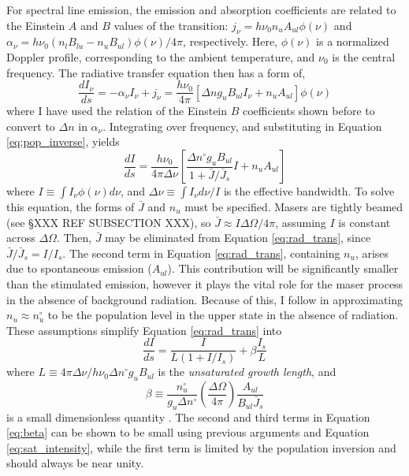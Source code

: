 For spectral line emission, the emission and absorption coefficients are related to the Einstein $A$ and $B$ values of the transition: $j_\nu = h \nu_0 n_u A_{ul}\phi(\nu)$ and $\alpha_\nu = h\nu_0 \left( n_l B_{lu} - n_u B_{ul} \right)\phi(\nu)/4\pi$, respectively. Here, $\phi(\nu)$ is a normalized Doppler profile, corresponding to the ambient temperature, and $\nu_0$ is the central frequency. The radiative transfer equation then has a form of,
\begin{equation}
\label{eq:rad_trans_specific}
\frac{dI_{\nu}}{ds} = -\alpha_{\nu}I_{\nu} + j_{\nu}
    = \frac{h \nu_0}{4\pi} \left[ \Delta n g_u B_{ul} I_{\nu} + n_u A_{ul} \right] \phi(\nu)
\end{equation}
where I have used the relation of the Einstein $B$ coefficients shown before to convert to $\Delta n$ in $\alpha_{\nu}$. Integrating over frequency, and substituting in Equation \ref{eq:pop_inverse}, yields
\begin{equation}
\label{eq:rad_trans}
\frac{dI}{ds} = \frac{h\nu_0}{4\pi \Delta \nu} \left[ \frac{\Delta n^{\circ} g_u B_{ul}}{1 + \bar{J}/\bar{J}_s} I + n_u A_{ul} \right]
\end{equation}
where $I \equiv \int I_{\nu}\phi(\nu)d\nu$, and $\Delta \nu \equiv \int I_{\nu}d\nu/I$ is the effective bandwidth. To solve this equation, the forms of $\bar{J}$ and $n_u$ must be specified. Masers are tightly beamed (see \S XXX REF SUBSECTION XXX), so $\bar{J} \approx I\Delta\Omega/4\pi$, assuming $I$ is constant across $\Delta\Omega$. Then, $\bar{J}$ may be eliminated from Equation \ref{eq:rad_trans}, since $\bar{J}/\bar{J}_s = I/I_s$. The second term in Equation \ref{eq:rad_trans}, containing $n_u$, arises due to spontaneous emission ($A_{ul}$). This contribution will be significantly smaller than the stimulated emission, however it plays the vital role for the maser process in the absence of background radiation. Because of this, I follow \citet{stahler_palla_2004} in approximating $n_u \approx n_u^{\circ}$ to be the population level in the upper state in the absence of radiation. These assumptions simplify Equation \ref{eq:rad_trans} into
\begin{equation}
\label{eq:final_rad_trans}
\frac{dI}{ds} = \frac{I}{L (1+I/I_s)} + \beta \frac{I_s}{L}
\end{equation}
where $L \equiv 4 \pi \Delta \nu / h \nu_0 \Delta n^{\circ} g_u B_{ul}$ is the {\it unsaturated growth length}, and
\begin{equation}
\label{eq:beta}
\beta \equiv \frac{n_u^{\circ}}{g_u\Delta n^{\circ}} \left( \frac{\Delta\Omega}{4\pi} \right) \frac{A_{ul}}{B_{ul}\bar{J}_s}
\end{equation}
is a small dimensionless quantity \citep{stahler_palla_2004}. The second and third terms in Equation \ref{eq:beta} can be shown to be small using previous arguments and Equation \ref{eq:sat_intensity}, while the first term is limited by the population inversion and should always be near unity.

